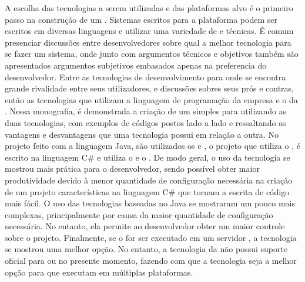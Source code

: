 A escolha das tecnologias a serem utilizadas e das plataformas alvo é o primeiro passo na construção de um . Sistemas escritos para a plataforma  podem ser escritos em diversas linguagens e utilizar uma variedade de  e técnicas. É comum presenciar discussões entre desenvolvedores sobre qual a melhor tecnologia para se fazer um sistema, onde junto com argumentos técnicos e objetivos também são apresentados argumentos subjetivos embasados apenas na preferencia do desenvolvedor. Entre as tecnologias de desenvolvimento para  onde se encontra grande rivalidade entre seus utilizadores, e discussões sobres seus prós e contras, então as tecnologias que utilizam a linguagem de programação  da empresa  e o  da . Nessa monografia, é demonstrada a criação de um  simples para  utilizando as duas tecnologias, com exemplos de códigos postos lado a lado e ressaltando as vantagens e desvantagens que uma tecnologia possui em relação a outra. No projeto feito com a linguagem Java, são utilizados os   e , o projeto que utiliza o  , é escrito na linguagem C\# e utiliza o  e o . De modo geral, o uso da tecnologia  se mostrou mais prática para o desenvolvedor, sendo possível obter maior produtividade devido à menor quantidade de configuração necessária na criação de um projeto características na linguagem C\# que tornam a escrita de código mais fácil. O uso das tecnologias baseadas no Java se mostraram um pouco mais complexas, principalmente por causa da maior quantidade de configuração necessária. No entanto,  ela permite ao desenvolvedor obter um maior controle sobre o projeto. Finalmente, se o  for ser executado em um servidor , a tecnologia  se mostrou uma melhor opção. No entanto, a tecnologia da  não possui suporte oficial para  ou  no presente momento,  fazendo com que a tecnologia  seja a melhor opção para  que executam em múltiplas plataformas.

